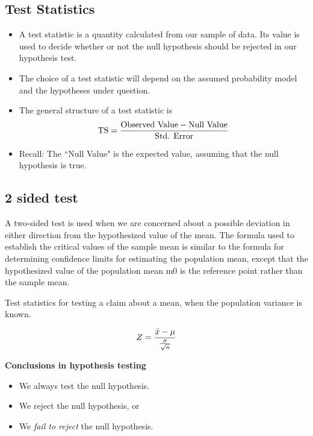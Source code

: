 \documentclass[]{report}
\begin{document}
{\subsection{Test Statistics}
\begin{itemize}
\item A test statistic is a quantity calculated from our sample of data. Its value is used to decide whether or not the null hypothesis should be rejected in our hypothesis test.
\item The choice of a test statistic will depend on the assumed probability model and the hypotheses under question.
\item The general structure of a test statistic is
\[ \mbox{TS}  = {\mbox{Observed Value} - \mbox{Null Value}  \over \mbox{Std. Error}}\]
\item Recall: The ``Null Value" is the expected value, assuming that the null hypothesis is true.
\end{itemize}






\subsection{2 sided test}
A two-sided test is used when we are concerned about a possible
deviation in either direction from the hypothesized value of the
mean. The formula used to establish the critical values of the
sample mean is similar to the formula for determining confidence
limits for estimating the population mean, except that the
hypothesized value of the population mean m0 is the reference
point rather than the sample mean.






{

Test statistics for testing a claim about a mean, when the population variance is known.

\[ Z = {\bar{x}  - \mu \over {\sigma \over \sqrt{n}}} \]
}






\begin{framed}
\textbf{Conclusions in hypothesis testing}
\begin{itemize}
\item We always test the null hypothesis.
\item We reject the null hypothesis, or
\item We \emph{ fail to reject} the null hypothesis.
\end{itemize}
\end{framed}









}
\end{document}
